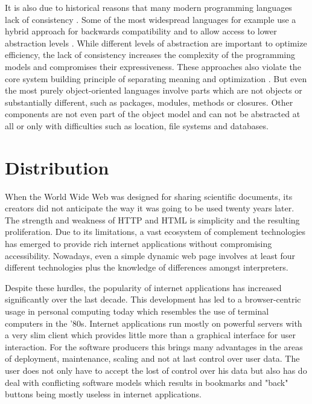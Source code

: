 It is also due to historical reasons that many modern programming languages lack of consistency \cite{ReshapingJava}. Some of the most widespread languages for example use a hybrid approach for backwards compatibility \cite{JavaCritics} and to allow access to lower abstraction levels \cite{CppCritics}. While different levels of abstraction are important to optimize efficiency, the lack of consistency increases the complexity of the programming models and compromises their expressiveness. These approaches also violate the core system building principle of separating meaning and optimization \cite{Steps2008}. But even the most purely object-oriented languages involve parts which are not objects or substantially different, such as packages, modules, methods or closures. Other components are not even part of the object model and can not be abstracted at all or only with difficulties such as location, file systems and databases.

\section{Distribution}

When the World Wide Web was designed for sharing scientific documents, its creators did not anticipate the way it was going to be used twenty years later. The strength and weakness of HTTP and HTML is simplicity and the resulting proliferation. Due to its limitations, a vast ecosystem of complement technologies has emerged to provide rich internet applications without compromising accessibility. Nowadays, even a simple dynamic web page involves at least four different technologies plus the knowledge of differences amongst interpreters.

Despite these hurdles, the popularity of internet applications has increased significantly over the last decade. This development has led to a browser-centric usage in personal computing today which resembles the use of terminal computers in the '80s. Internet applications run mostly on powerful servers with a very slim client which provides little more than a graphical interface for user interaction. For the software producers this brings many advantages in the areas of deployment, maintenance, scaling and not at last control over user data. The user does not only have to accept the lost of control over his data but also has do deal with conflicting software models which results in bookmarks and "back" buttons being mostly useless in internet applications.

